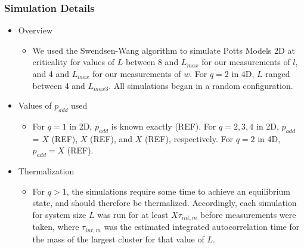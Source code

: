 \documentclass[11pt]{article}
\begin{document}
\subsubsection{Simulation Details}
\label{sec-4.2.5}

\begin{itemize}

\item Overview\\
\label{sec-4.2.5.1}

\begin{itemize}

\item We used the Swendsen-Wang algorithm to simulate Potts Models 2D at criticality for values of $L$ between 8 and $L_{max}$ for our  measurements of $l$, and 4 and $L_{max}$ for our measurements of $w$.  For $q=2$ in 4D, $L$ ranged between 4 and $L_{max3}$.  All simulations began in a random configuration.\\
\label{sec-4.2.5.1.1}

\end{itemize} %

\item Values of $p_{add}$ used\\
\label{sec-4.2.5.2}

\begin{itemize}

\item For $q=1$ in 2D, $p_{add}$ is known exactly (REF).  For $q=2,3,4$ in 2D, $p_{add}$ = $X$ (REF), $X$ (REF), and $X$ (REF), respectively. For $q=2$ in 4D, $p_{add}=X$ (REF).\\
\label{sec-4.2.5.2.1}

\end{itemize} %

\item Thermalization\\
\label{sec-4.2.5.3}

\begin{itemize}

\item For $q>1$, the simulations require some time to achieve an equilibrium state, and should therefore be thermalized. Accordingly, each simulation for system size $L$ was run for at least $X \tau_{int,m}$ before measurements were taken, where $\tau_{int,m}$ was the estimated integrated autocorrelation time for the mass of the largest cluster for that value of $L$.\\
\label{sec-4.2.5.3.1}



\end{itemize}
\end{itemize}
\end{document}

